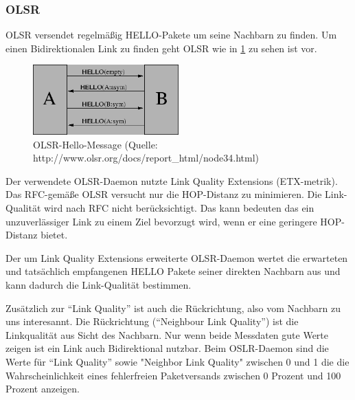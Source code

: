 \documentclass[a4paper,10pt]{article}
\begin{document}

\subsubsection*{OLSR}



OLSR versendet regelmäßig HELLO-Pakete um seine Nachbarn zu finden.
Um einen Bidirektionalen Link zu finden geht OLSR wie in \ref{olsr-hello} zu sehen
ist vor.

\begin{figure}[thb]
 \begin{center}
   \includegraphics[width=0.5\textwidth]{hello-message.png}
    \caption{OLSR-Hello-Message (Quelle: http://www.olsr.org/docs/report_html/node34.html)}
    \label{olsr-hello}
  \end{center}
\end{figure}

Der verwendete OLSR-Daemon nutzte Link Quality Extensions (ETX-metrik).
Das RFC-gemäße OLSR versucht nur die HOP-Distanz zu minimieren. Die Link-Qualität
wird nach RFC nicht berücksichtigt. Das kann bedeuten das ein unzuverlässiger Link zu einem Ziel bevorzugt wird,
wenn er eine geringere HOP-Distanz bietet.

Der um Link Quality Extensions erweiterte OLSR-Daemon wertet die erwarteten und tatsächlich empfangenen
HELLO Pakete seiner direkten Nachbarn aus und kann dadurch die Link-Qualität bestimmen.

Zusätzlich zur "`Link Quality"' ist auch die Rückrichtung, also vom Nachbarn zu uns interesannt.
Die Rückrichtung ("`Neighbour Link Quality"') ist die Linkqualität aus Sicht des Nachbarn.
Nur wenn beide Messdaten gute Werte zeigen ist ein Link auch Bidirektional nutzbar.
Beim OSLR-Daemon sind die Werte für "`Link Quality"' sowie "Neighbor Link Quality" zwischen
0 und 1 die die Wahrscheinlichkeit eines fehlerfreien Paketversands zwischen 0 Prozent und 100 Prozent anzeigen.
\end{document}
